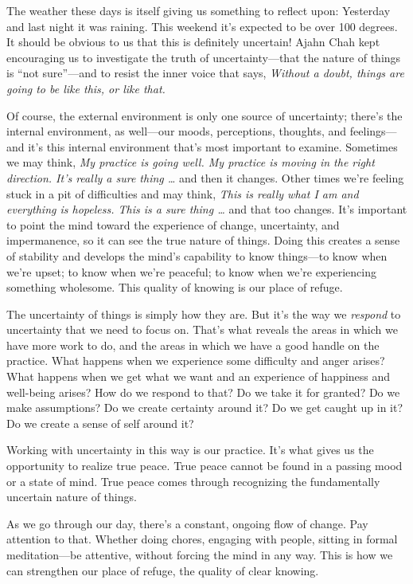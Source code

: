 
The weather these days is itself giving us something to reflect upon: 
Yesterday and last night it was raining. This weekend it's expected to 
be over 100 degrees. It should be obvious to us that this is definitely 
uncertain! Ajahn Chah kept encouraging us to investigate the truth of 
uncertainty---that the nature of things is ``not sure''---and to resist 
the inner voice that says, \emph{Without a doubt, things are going to 
be like this, or like that.}

Of course, the external environment is only one source of uncertainty; 
there's the internal environment, as well---our moods, perceptions, 
thoughts, and feelings---and it's this internal environment that's most 
important to examine. Sometimes we may think, \emph{My practice is 
going well. My practice is moving in the right direction. It's really a 
sure thing …} and then it changes. Other times we're feeling stuck in 
a pit of difficulties and may think, \emph{This is really what I am and 
everything is hopeless. This is a sure thing …} and that too changes. 
It's important to point the mind toward the experience of change, 
uncertainty, and impermanence, so it can see the true nature of things. 
Doing this creates a sense of stability and develops the mind's 
capability to know things---to know when we're upset; to know when 
we're peaceful; to know when we're experiencing something wholesome. 
This quality of knowing is our place of refuge.

The uncertainty of things is simply how they are. But it's the way we 
\emph{respond} to uncertainty that we need to focus on. That's what 
reveals the areas in which we have more work to do, and the areas in 
which we have a good handle on the practice. What happens when we 
experience some difficulty and anger arises? What happens when we get 
what we want and an experience of happiness and well-being arises? How 
do we respond to that? Do we take it for granted? Do we make 
assumptions? Do we create certainty around it? Do we get caught up in 
it? Do we create a sense of self around it?

Working with uncertainty in this way is our practice. It's what gives 
us the opportunity to realize true peace. True peace cannot be found in 
a passing mood or a state of mind. True peace comes through recognizing 
the fundamentally uncertain nature of things.

As we go through our day, there's a constant, ongoing flow of change. 
Pay attention to that. Whether doing chores, engaging with people, 
sitting in formal meditation---be attentive, without forcing the mind 
in any way. This is how we can strengthen our place of refuge, the 
quality of clear knowing.

